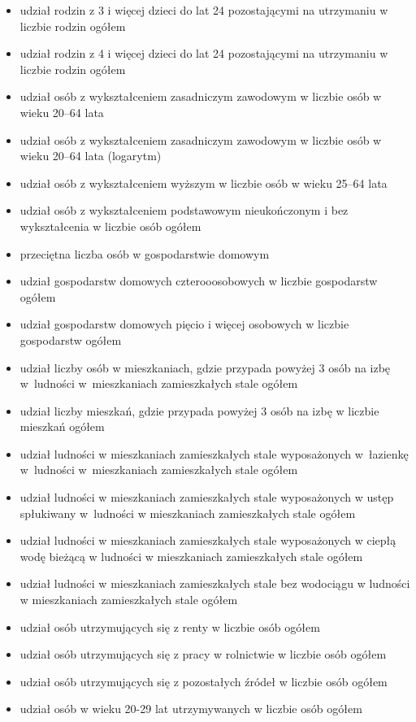\begin{itemize}
\item udział rodzin z 3 i więcej dzieci do lat 24 pozostającymi na utrzymaniu w liczbie rodzin ogółem
\item udział rodzin z 4 i więcej dzieci do lat 24 pozostającymi na utrzymaniu w liczbie rodzin ogółem
\item udział osób z wykształceniem zasadniczym zawodowym w liczbie osób w wieku 20--64 lata
\item udział osób z wykształceniem zasadniczym zawodowym w liczbie osób w wieku 20--64 lata (logarytm)
\item udział osób z wykształceniem wyższym w liczbie osób w wieku 25--64 lata
\item udział osób z wykształceniem podstawowym nieukończonym i bez wykształcenia w liczbie osób ogółem
\item przeciętna liczba osób w gospodarstwie domowym
\item udział gospodarstw domowych czterooosobowych w liczbie gospodarstw ogółem
\item udział gospodarstw domowych pięcio i więcej osobowych w liczbie gospodarstw ogółem
\item udział liczby osób w mieszkaniach, gdzie przypada powyżej 3 osób na izbę w~ludności w~mieszkaniach zamieszkałych stale ogółem
\item udział liczby mieszkań, gdzie przypada powyżej 3 osób na izbę w liczbie mieszkań ogółem
\item udział ludności w mieszkaniach zamieszkałych stale wyposażonych w~łazienkę w~ludności w~mieszkaniach zamieszkałych stale ogółem
\item udział ludności w mieszkaniach zamieszkałych stale wyposażonych w ustęp spłukiwany w~ludności w mieszkaniach zamieszkałych stale ogółem
\item udział ludności w mieszkaniach zamieszkałych stale wyposażonych w ciepłą wodę bieżącą w ludności w mieszkaniach zamieszkałych stale ogółem
\item udział ludności w mieszkaniach zamieszkałych stale bez wodociągu w ludności w mieszkaniach zamieszkałych stale ogółem
\item udział osób utrzymujących się z renty w liczbie osób ogółem
\item udział osób utrzymujących się z pracy w rolnictwie w liczbie osób ogółem
\item udział osób utrzymujących się z pozostałych źródeł w liczbie osób ogółem
\item udział osób w wieku 20-29 lat utrzymywanych w liczbie osób ogółem

\end{itemize}
